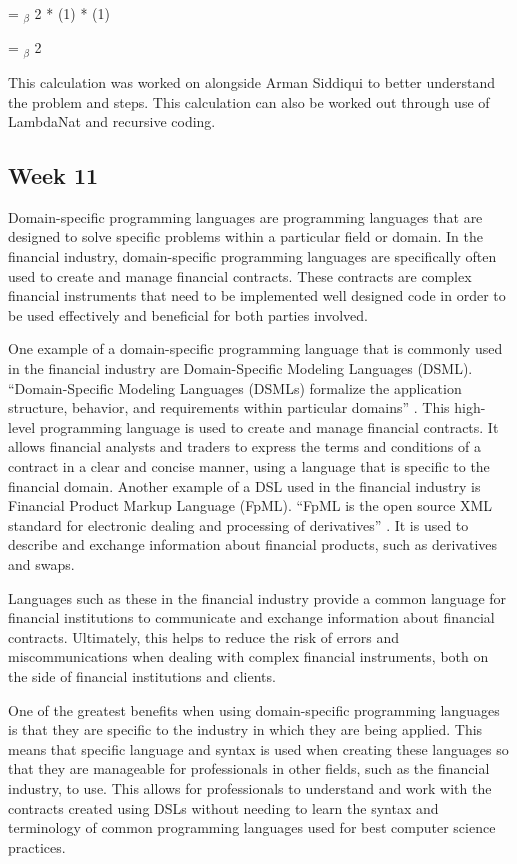 \documentclass{article}
\theoremstyle{theorem}
\theoremstyle{definition}
\theoremstyle{remark}
\begin{document}
= $_\beta$ 2 * (1) * (1)

= $_\beta$ 2

\medskip\noindent
This calculation was worked on alongside Arman Siddiqui to better understand the problem and steps. This calculation can also be worked out through use of LambdaNat and recursive coding.

\medskip\noindent

\subsection{Week 11}

Domain-specific programming languages are programming languages that are designed to solve specific problems within a particular field or domain. In the financial industry, domain-specific programming languages are specifically often used to create and manage financial contracts. These contracts are complex financial instruments that need to be implemented well designed code in order to be used effectively and beneficial for both parties involved.

One example of a domain-specific programming language that is commonly used in the financial industry are Domain-Specific Modeling Languages (DSML). “Domain-Specific Modeling Languages (DSMLs) formalize the application structure, behavior, and requirements within particular domains” \cite{19}. This high-level programming language is used to create and manage financial contracts. It allows financial analysts and traders to express the terms and conditions of a contract in a clear and concise manner, using a language that is specific to the financial domain. Another example of a DSL used in the financial industry is Financial Product Markup Language (FpML). “FpML is the open source XML standard for electronic dealing and processing of derivatives” \cite{20}. It is used to describe and exchange information about financial products, such as derivatives and swaps.

Languages such as these in the financial industry provide a common language for financial institutions to communicate and exchange information about financial contracts. Ultimately, this helps to reduce the risk of errors and miscommunications when dealing with complex financial instruments, both on the side of financial institutions and clients.

One of the greatest benefits when using domain-specific programming languages is that they are specific to the industry in which they are being applied. This means that specific language and syntax is used when creating these languages so that they are manageable for professionals in other fields, such as the financial industry, to use.  This allows for professionals to understand and work with the contracts created using DSLs without needing to learn the syntax and terminology of common programming languages used for best computer science practices.
\end{document}
